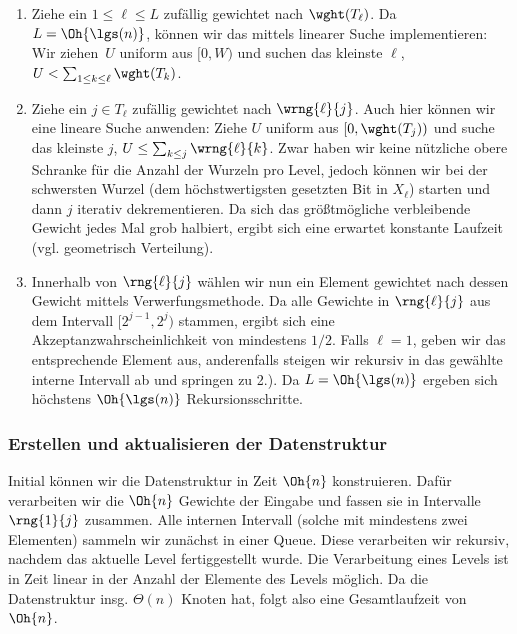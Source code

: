 \begin{enumerate}
    \item Ziehe ein $1 \le \ell \le L$ zufällig gewichtet nach $\wght(T_\ell)$.
          Da $L = \Oh{\lgs(n)}$, können wir das mittels linearer Suche implementieren:
          Wir ziehen~$U$ uniform aus $[0, W)$ und suchen das kleinste $\ell$, \sd $U < \sum_{1\le k \le \ell} \wght(T_k)$.

    \item Ziehe ein $j \in T_\ell$ zufällig gewichtet nach $\wrng{\ell}{j}$.
          Auch hier können wir eine lineare Suche anwenden:
          Ziehe $U$ uniform aus $[0, \wght(T_j))$ und suche das kleinste $j$, \sd $U \le \sum_{k \le j} \wrng{\ell}{k}$.
          Zwar haben wir keine nützliche obere Schranke für die Anzahl der Wurzeln pro Level, jedoch können wir bei der schwersten Wurzel (\dh dem höchstwertigsten gesetzten Bit in $X_\ell$) starten und dann $j$ iterativ dekrementieren.
          Da sich das größtmögliche verbleibende Gewicht jedes Mal grob halbiert, ergibt sich eine erwartet konstante Laufzeit (vgl. geometrisch Verteilung).

    \item Innerhalb von $\rng{\ell}{j}$ wählen wir nun ein Element gewichtet nach dessen Gewicht mittels Verwerfungsmethode.
          Da alle Gewichte in $\rng{\ell}{j}$ aus dem Intervall $[2^{j-1}, 2^j)$ stammen, ergibt sich eine Akzeptanzwahrscheinlichkeit von mindestens $1/2$.
          Falls $\ell = 1$, geben wir das entsprechende Element aus, anderenfalls steigen wir rekursiv in das gewählte interne Intervall ab und springen zu 2.).
          Da $L = \Oh{\lgs(n)}$ ergeben sich höchstens $\Oh{\lgs(n)}$ Rekursionsschritte.
\end{enumerate}

\subsubsection{Erstellen und aktualisieren der Datenstruktur}
Initial können wir die Datenstruktur in Zeit $\Oh{n}$ konstruieren.
Dafür verarbeiten wir die $\Oh{n}$ Gewichte der Eingabe und fassen sie in Intervalle $\rng{1}{j}$ zusammen.
Alle internen Intervall (\dh solche mit mindestens zwei Elementen) sammeln wir zunächst in einer Queue.
Diese verarbeiten wir rekursiv, nachdem das aktuelle Level fertiggestellt wurde.
Die Verarbeitung eines Levels ist in Zeit linear in der Anzahl der Elemente des Levels möglich.
Da die Datenstruktur insg. $\Theta(n)$ Knoten hat, folgt also eine Gesamtlaufzeit von $\Oh{n}$.

